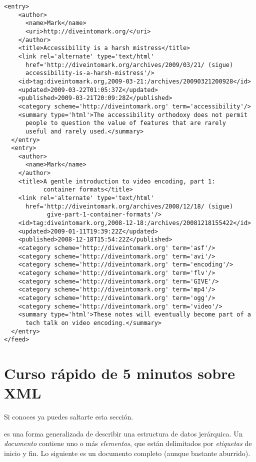 \noindent\begin{minipage}{\textwidth}
\begin{lstlisting}[mathescape=True]
  <entry>
    <author>
      <name>Mark</name>
      <uri>http://diveintomark.org/</uri>
    </author>
    <title>Accessibility is a harsh mistress</title>
    <link rel='alternate' type='text/html'
      href='http://diveintomark.org/archives/2009/03/21/ (sigue)
      accessibility-is-a-harsh-mistress'/>
    <id>tag:diveintomark.org,2009-03-21:/archives/20090321200928</id>
    <updated>2009-03-22T01:05:37Z</updated>
    <published>2009-03-21T20:09:28Z</published>
    <category scheme='http://diveintomark.org' term='accessibility'/>
    <summary type='html'>The accessibility orthodoxy does not permit
      people to question the value of features that are rarely 
      useful and rarely used.</summary>
  </entry>
  <entry>
    <author>
      <name>Mark</name>
    </author>
    <title>A gentle introduction to video encoding, part 1: 
           container formats</title>
    <link rel='alternate' type='text/html'
      href='http://diveintomark.org/archives/2008/12/18/ (sigue)
            give-part-1-container-formats'/>
    <id>tag:diveintomark.org,2008-12-18:/archives/20081218155422</id>
    <updated>2009-01-11T19:39:22Z</updated>
    <published>2008-12-18T15:54:22Z</published>
    <category scheme='http://diveintomark.org' term='asf'/>
    <category scheme='http://diveintomark.org' term='avi'/>
    <category scheme='http://diveintomark.org' term='encoding'/>
    <category scheme='http://diveintomark.org' term='flv'/>
    <category scheme='http://diveintomark.org' term='GIVE'/>
    <category scheme='http://diveintomark.org' term='mp4'/>
    <category scheme='http://diveintomark.org' term='ogg'/>
    <category scheme='http://diveintomark.org' term='video'/>
    <summary type='html'>These notes will eventually become part of a
      tech talk on video encoding.</summary>
  </entry>
</feed>
\end{lstlisting}
\end{minipage}

\section{Curso rápido de 5 minutos sobre XML}

Si conoces ya  puedes saltarte esta sección.

 es una forma generalizada de describir una estructura de datos jerárquica. Un \emph{documento}  contiene uno o más \emph{elementos}, que están delimitados por \emph{etiquetas} de inicio y fin. Lo siguiente es un documento  completo (aunque bastante aburrido).

